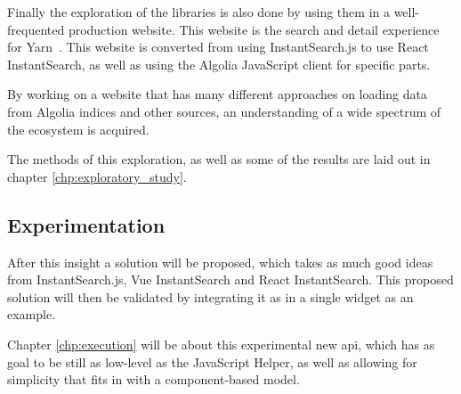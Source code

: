 Finally the exploration of the libraries is also done by using them in a well-frequented production website. This website is the search and detail experience for Yarn\cite{yarn-site}~. This website is converted from using InstantSearch.js to use React InstantSearch, as well as using the Algolia JavaScript client for specific parts.

By working on a website that has many different approaches on loading data from Algolia indices and other sources, an understanding of a wide spectrum of the ecosystem is acquired.

The methods of this exploration, as well as some of the results are laid out in chapter \ref{chp:exploratory_study}.

\subsection{Experimentation}

After this insight a solution will be proposed, which takes as much good ideas from InstantSearch.js, Vue InstantSearch and React InstantSearch. This proposed solution will then be validated by integrating it as in a single widget as an example.

Chapter \ref{chp:execution} will be about this experimental new \acrshort{api}, which has as goal to be still as low-level as the JavaScript Helper, as well as allowing for simplicity that fits in with a component-based model.
